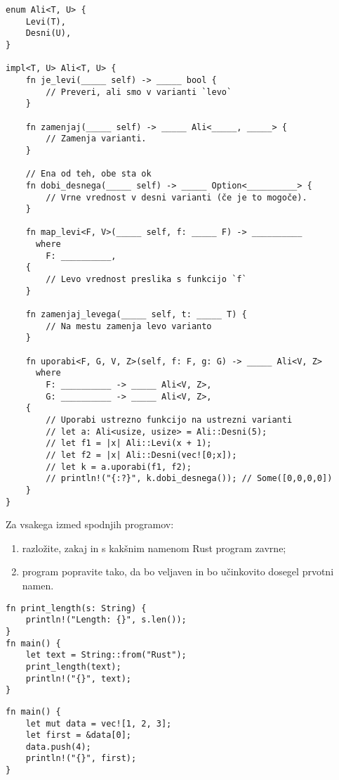 \documentclass[11pt]{../izpit}
\begin{document}
{\large
\begin{verbatim}
enum Ali<T, U> {
    Levi(T),
    Desni(U),
}

impl<T, U> Ali<T, U> {
    fn je_levi(_____ self) -> _____ bool {
        // Preveri, ali smo v varianti `levo`
    }

    fn zamenjaj(_____ self) -> _____ Ali<_____, _____> {
        // Zamenja varianti.
    }

    // Ena od teh, obe sta ok
    fn dobi_desnega(_____ self) -> _____ Option<__________> {
        // Vrne vrednost v desni varianti (če je to mogoče).
    }

    fn map_levi<F, V>(_____ self, f: _____ F) -> __________
      where
        F: __________,
    {
        // Levo vrednost preslika s funkcijo `f`
    }
    
    fn zamenjaj_levega(_____ self, t: _____ T) {
        // Na mestu zamenja levo varianto
    }

    fn uporabi<F, G, V, Z>(self, f: F, g: G) -> _____ Ali<V, Z>
      where
        F: __________ -> _____ Ali<V, Z>,
        G: __________ -> _____ Ali<V, Z>,
    {
        // Uporabi ustrezno funkcijo na ustrezni varianti
        // let a: Ali<usize, usize> = Ali::Desni(5);
        // let f1 = |x| Ali::Levi(x + 1);
        // let f2 = |x| Ali::Desni(vec![0;x]);
        // let k = a.uporabi(f1, f2);
        // println!("{:?}", k.dobi_desnega()); // Some([0,0,0,0])
    }
}
\end{verbatim}
}



\naloga[\tocke{20}]
Za vsakega izmed spodnjih programov:
\begin{enumerate}
  \item razložite, zakaj in s kakšnim namenom Rust program zavrne;
  \item program popravite tako, da bo veljaven in bo učinkovito dosegel prvotni namen.
\end{enumerate}

\podnaloga
\begin{verbatim}
fn print_length(s: String) {
    println!("Length: {}", s.len());
}
fn main() {
    let text = String::from("Rust");
    print_length(text);
    println!("{}", text);
}
\end{verbatim}

\podnaloga
\begin{verbatim}
fn main() {
    let mut data = vec![1, 2, 3];
    let first = &data[0];
    data.push(4);
    println!("{}", first);
}
\end{verbatim}
\end{document}
